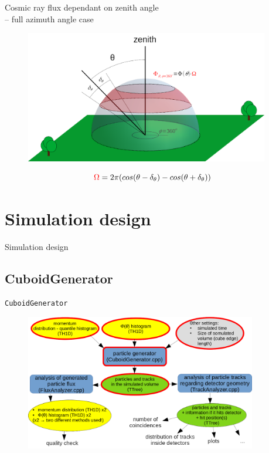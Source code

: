 \documentclass{beamer}
\begin{document}
\begin{frame}{Cosmic ray flux dependant on zenith angle\\-- full azimuth angle case}
\begin{figure}
\includegraphics[width=0.95\textwidth]{images/fluxZenith.png}%
\end{figure}
\[
\textcolor{red}{\Omega} = 2\pi (cos (\theta - \delta_\theta) - cos(\theta + \delta_\theta))
\]


\end{frame}

\section{Simulation design}

\begin{frame}
\vfill
\centering
\Huge{Simulation design}

\vfill
\end{frame}

\subsection{CuboidGenerator}

\begin{frame}{\texttt{CuboidGenerator}}
\begin{figure}
\includegraphics[width=0.9\textwidth]{images/sim_scheme_cuboid.png}%
\end{figure}
\end{frame}
\end{document}
